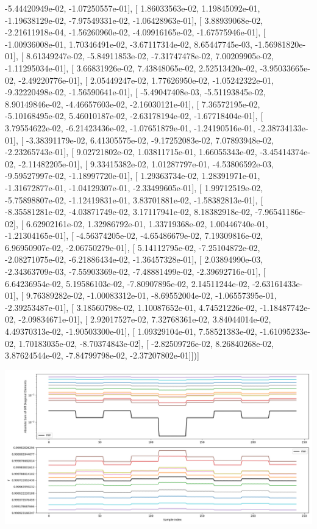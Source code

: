 \documentclass{article}
\begin{document}
         -5.44420949e-02,  -1.07250557e-01],
       [  1.86033563e-02,   1.19845092e-01,  -1.19638129e-02,
         -7.97549331e-02,  -1.06428963e-01],
       [  3.88939068e-02,  -2.21611918e-04,  -1.56260960e-02,
         -4.09916165e-02,  -1.67575946e-01],
       [ -1.00936008e-01,   1.70346491e-02,  -3.67117314e-02,
          8.65447745e-03,  -1.56981820e-01],
       [  8.61349247e-02,  -5.84911853e-02,  -7.31747478e-02,
          7.00209905e-02,  -1.11295034e-01],
       [  3.66831926e-02,   7.43848065e-02,   2.52513420e-02,
         -3.95033665e-02,  -2.49220776e-01],
       [  2.05449247e-02,   1.77626950e-02,  -1.05242322e-01,
         -9.32220498e-02,  -1.56590641e-01],
       [ -5.49047408e-03,  -5.51193845e-02,   8.90149846e-02,
         -4.46657603e-02,  -2.16030121e-01],
       [  7.36572195e-02,  -5.10168495e-02,   5.46010187e-02,
         -2.63178194e-02,  -1.67718404e-01],
       [  3.79554622e-02,  -6.21423436e-02,  -1.07651879e-01,
         -1.24190516e-01,  -2.38734133e-01],
       [ -3.38391179e-02,   6.41305575e-02,  -9.17252083e-02,
          7.07893948e-02,  -2.23265743e-01],
       [  9.02721802e-02,   1.03811715e-01,   1.66055343e-02,
         -3.45414374e-02,  -2.11482205e-01],
       [  9.33415382e-02,   1.01287797e-01,  -4.53806592e-03,
         -9.59527997e-02,  -1.18997720e-01],
       [  1.29363734e-02,   1.28391971e-01,  -1.31672877e-01,
         -1.04129307e-01,  -2.33499605e-01],
       [  1.99712519e-02,  -5.75898807e-02,  -1.12419831e-01,
          3.83701881e-02,  -1.58382813e-01],
       [ -8.35581281e-02,  -4.03871749e-02,   3.17117941e-02,
          8.18382918e-02,  -7.96541186e-02],
       [  6.62902161e-02,   1.32986792e-01,   1.33719368e-02,
          1.00446740e-01,  -1.21304165e-01],
       [ -4.56374205e-02,  -4.65486679e-02,   7.19309816e-02,
          6.96950907e-02,  -2.06750279e-01],
       [  5.14112795e-02,  -7.25104872e-02,  -2.08271075e-02,
         -6.21886434e-02,  -1.36457328e-01],
       [  2.03894990e-03,  -2.34363709e-03,  -7.55903369e-02,
         -7.48881499e-02,  -2.39692716e-01],
       [  6.64236954e-02,   5.19586103e-02,  -7.80907895e-02,
          2.14511244e-02,  -2.63161433e-01],
       [  9.76389282e-02,  -1.00083312e-01,  -8.69552004e-02,
         -1.06557395e-01,  -2.39253487e-01],
       [  3.18560798e-02,   1.10087652e-01,   4.74521226e-02,
         -1.18487742e-02,  -2.09834671e-01],
       [  2.92017527e-02,   7.32768361e-02,   3.84044014e-02,
          4.49370313e-02,  -1.90503300e-01],
       [  1.09329104e-01,   7.58521383e-02,  -1.61095233e-02,
          1.70183035e-02,  -8.70374843e-02],
       [ -2.82509726e-02,   8.26840268e-02,   3.87624544e-02,
         -7.84799798e-02,  -2.37207802e-01]])]
\begin{center}
\includegraphics[scale=.9]{report_pickled_controls249/control_dpn_all.png}

\end{center}
\end{document}
